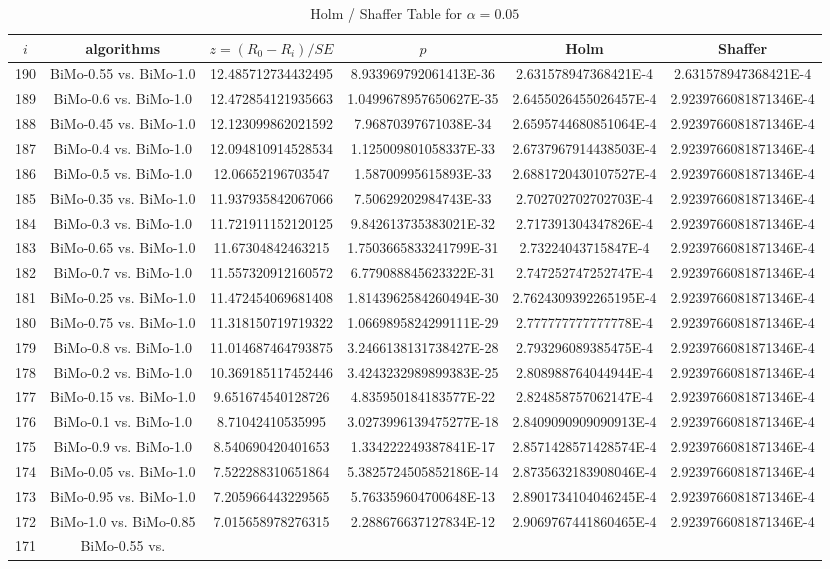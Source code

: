 \documentclass[a4paper,10pt]{article}
\begin{document}
\begin{landscape}
\begin{table}[!htp]
\centering\tiny
\caption{Holm / Shaffer Table for $\alpha=0.05$}
\begin{tabular}{cccccc}
$i$&algorithms&$z=(R_0 - R_i)/SE$&$p$&Holm&Shaffer\\
\hline
190&BiMo-0.55 vs. BiMo-1.0&12.485712734432495&8.933969792061413E-36&2.631578947368421E-4&2.631578947368421E-4\\189&BiMo-0.6 vs. BiMo-1.0&12.472854121935663&1.0499678957650627E-35&2.6455026455026457E-4&2.9239766081871346E-4\\188&BiMo-0.45 vs. BiMo-1.0&12.123099862021592&7.96870397671038E-34&2.6595744680851064E-4&2.9239766081871346E-4\\187&BiMo-0.4 vs. BiMo-1.0&12.094810914528534&1.125009801058337E-33&2.6737967914438503E-4&2.9239766081871346E-4\\186&BiMo-0.5 vs. BiMo-1.0&12.06652196703547&1.58700995615893E-33&2.6881720430107527E-4&2.9239766081871346E-4\\185&BiMo-0.35 vs. BiMo-1.0&11.937935842067066&7.50629202984743E-33&2.702702702702703E-4&2.9239766081871346E-4\\184&BiMo-0.3 vs. BiMo-1.0&11.721911152120125&9.842613735383021E-32&2.717391304347826E-4&2.9239766081871346E-4\\183&BiMo-0.65 vs. BiMo-1.0&11.67304842463215&1.7503665833241799E-31&2.73224043715847E-4&2.9239766081871346E-4\\182&BiMo-0.7 vs. BiMo-1.0&11.557320912160572&6.779088845623322E-31&2.747252747252747E-4&2.9239766081871346E-4\\181&BiMo-0.25 vs. BiMo-1.0&11.472454069681408&1.8143962584260494E-30&2.7624309392265195E-4&2.9239766081871346E-4\\180&BiMo-0.75 vs. BiMo-1.0&11.318150719719322&1.0669895824299111E-29&2.777777777777778E-4&2.9239766081871346E-4\\179&BiMo-0.8 vs. BiMo-1.0&11.014687464793875&3.2466138131738427E-28&2.793296089385475E-4&2.9239766081871346E-4\\178&BiMo-0.2 vs. BiMo-1.0&10.369185117452446&3.4243232989899383E-25&2.808988764044944E-4&2.9239766081871346E-4\\177&BiMo-0.15 vs. BiMo-1.0&9.651674540128726&4.835950184183577E-22&2.824858757062147E-4&2.9239766081871346E-4\\176&BiMo-0.1 vs. BiMo-1.0&8.71042410535995&3.0273996139475277E-18&2.8409090909090913E-4&2.9239766081871346E-4\\175&BiMo-0.9 vs. BiMo-1.0&8.540690420401653&1.334222249387841E-17&2.8571428571428574E-4&2.9239766081871346E-4\\174&BiMo-0.05 vs. BiMo-1.0&7.522288310651864&5.3825724505852186E-14&2.8735632183908046E-4&2.9239766081871346E-4\\173&BiMo-0.95 vs. BiMo-1.0&7.205966443229565&5.763359604700648E-13&2.8901734104046245E-4&2.9239766081871346E-4\\172&BiMo-1.0 vs. BiMo-0.85&7.015658978276315&2.288676637127834E-12&2.9069767441860465E-4&2.9239766081871346E-4\\171&BiMo-0.55 vs. 
\end{tabular}
\end{table}
\end{landscape}
\end{document}
